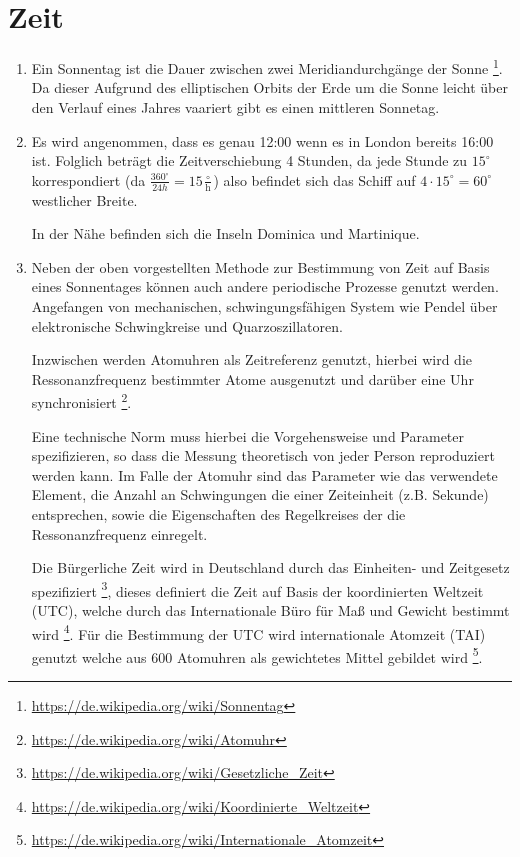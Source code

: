 \documentclass[DIN, pagenumber=false, fontsize=11pt, parskip=half]{scrartcl}
\begin{document}
    \section{Zeit}
    \begin{enumerate}[label=\alph*)]
        \item Ein Sonnentag ist die Dauer zwischen zwei Meridiandurchgänge der Sonne
            \footnote{\url{https://de.wikipedia.org/wiki/Sonnentag}}. Da dieser Aufgrund
            des elliptischen Orbits der Erde um die Sonne leicht über den Verlauf eines
            Jahres vaariert gibt es einen mittleren Sonnetag.
        \item Es wird angenommen, dass es genau 12:00 wenn es in London bereits
            16:00 ist. Folglich beträgt die Zeitverschiebung 4 Stunden, da jede
            Stunde zu $15^\circ$ korrespondiert (da 
            $\frac{360^\circ}{24h} = 15\frac{\circ}{\text{h}}$)
            also befindet sich das Schiff auf $4 \cdot 15^\circ = 60^\circ$ westlicher
            Breite.

            In der Nähe befinden sich die Inseln Dominica und Martinique.
        \item Neben der oben vorgestellten Methode zur Bestimmung von Zeit auf Basis
            eines Sonnentages können auch andere periodische Prozesse genutzt werden.
            Angefangen von mechanischen, schwingungsfähigen System wie Pendel über
            elektronische Schwingkreise und Quarzoszillatoren.

            Inzwischen werden Atomuhren als Zeitreferenz genutzt, hierbei wird die
            Ressonanzfrequenz bestimmter Atome ausgenutzt und darüber eine Uhr
            synchronisiert \footnote{\url{https://de.wikipedia.org/wiki/Atomuhr}}.
            
            Eine technische Norm muss hierbei die Vorgehensweise und Parameter
            spezifizieren, so dass die Messung theoretisch von jeder Person reproduziert
            werden kann. Im Falle der Atomuhr sind das Parameter wie das verwendete
            Element, die Anzahl an Schwingungen die einer Zeiteinheit (z.B. Sekunde)
            entsprechen, sowie die Eigenschaften des Regelkreises der die Ressonanzfrequenz
            einregelt.

            Die Bürgerliche Zeit wird in Deutschland durch das Einheiten- und
            Zeitgesetz spezifiziert 
            \footnote{\url{https://de.wikipedia.org/wiki/Gesetzliche_Zeit}},
            dieses definiert die Zeit auf Basis der koordinierten Weltzeit (UTC),
            welche durch das Internationale Büro für Maß und Gewicht bestimmt wird
            \footnote{\url{https://de.wikipedia.org/wiki/Koordinierte_Weltzeit}}.
            Für die Bestimmung der UTC wird internationale Atomzeit (TAI) genutzt
            welche aus 600 Atomuhren als gewichtetes Mittel gebildet wird
            \footnote{\url{https://de.wikipedia.org/wiki/Internationale_Atomzeit}}. 
    \end{enumerate}
    
\end{document}
